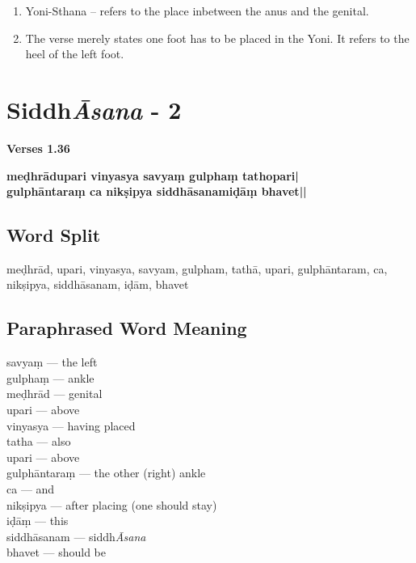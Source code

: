 \begin{enumerate}
\item Yoni-Sthana – refers to the place inbetween the anus and the genital. 
\item The verse merely states one foot has to be placed in the Yoni. It refers to the heel of the left foot. 
\end{enumerate}
\newpage

\section*{Siddh\textit{Āsana} - 2}

\noindent 
\textbf{Verses 1.36}

\begin{shloka}
\textbf{meḍhrādupari vinyasya savyaṃ gulphaṃ tathopari|}\\
\textbf{gulphāntaraṃ ca nikṣipya siddhāsanamiḍāṃ bhavet||}
\end{shloka}

\subsection*{Word Split}

meḍhrād, upari, vinyasya, savyam, gulpham, tathā, upari, gulphāntaram, ca, nikṣipya, siddhāsanam, iḍām, bhavet

\subsection*{Paraphrased Word Meaning}

\begin{multicols}{2}
savyaṃ --- the left  \\
gulphaṃ --- ankle  \\
meḍhrād --- genital  \\ 
upari ---  above  \\
vinyasya --- having placed  \\
tatha --- also  \\
upari --- above  \\
gulphāntaraṃ --- the other (right) ankle  \\
ca --- and  \\
nikṣipya ---  after placing (one should stay) \\
iḍāṃ --- this \\
siddhāsanam --- siddh\textit{Āsana} \\
bhavet ---  should be
\end{multicols}
  
